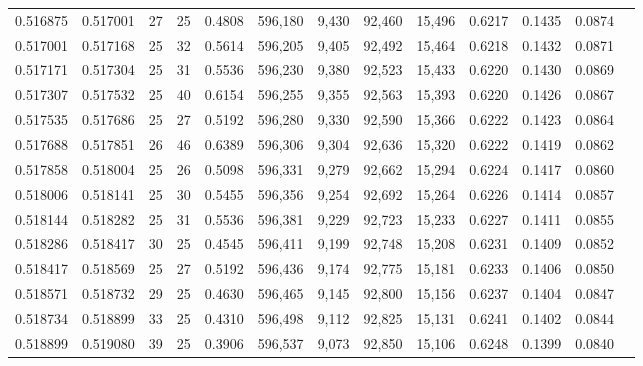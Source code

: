 \begin{tabular}{rrrrrrrrrrrrr}
0.516875 & 0.517001 &    27 &  25 &                                     0.4808 & 596,180 &   9,430 &  92,460 &  15,496 & 0.6217 & 0.1435 & 0.0874 \\
0.517001 & 0.517168 &    25 &  32 &                                     0.5614 & 596,205 &   9,405 &  92,492 &  15,464 & 0.6218 & 0.1432 & 0.0871 \\
0.517171 & 0.517304 &    25 &  31 &                                     0.5536 & 596,230 &   9,380 &  92,523 &  15,433 & 0.6220 & 0.1430 & 0.0869 \\
0.517307 & 0.517532 &    25 &  40 &                                     0.6154 & 596,255 &   9,355 &  92,563 &  15,393 & 0.6220 & 0.1426 & 0.0867 \\
0.517535 & 0.517686 &    25 &  27 &                                     0.5192 & 596,280 &   9,330 &  92,590 &  15,366 & 0.6222 & 0.1423 & 0.0864 \\
0.517688 & 0.517851 &    26 &  46 &                                     0.6389 & 596,306 &   9,304 &  92,636 &  15,320 & 0.6222 & 0.1419 & 0.0862 \\
0.517858 & 0.518004 &    25 &  26 &                                     0.5098 & 596,331 &   9,279 &  92,662 &  15,294 & 0.6224 & 0.1417 & 0.0860 \\
0.518006 & 0.518141 &    25 &  30 &                                     0.5455 & 596,356 &   9,254 &  92,692 &  15,264 & 0.6226 & 0.1414 & 0.0857 \\
0.518144 & 0.518282 &    25 &  31 &                                     0.5536 & 596,381 &   9,229 &  92,723 &  15,233 & 0.6227 & 0.1411 & 0.0855 \\
0.518286 & 0.518417 &    30 &  25 &                                     0.4545 & 596,411 &   9,199 &  92,748 &  15,208 & 0.6231 & 0.1409 & 0.0852 \\
0.518417 & 0.518569 &    25 &  27 &                                     0.5192 & 596,436 &   9,174 &  92,775 &  15,181 & 0.6233 & 0.1406 & 0.0850 \\
0.518571 & 0.518732 &    29 &  25 &                                     0.4630 & 596,465 &   9,145 &  92,800 &  15,156 & 0.6237 & 0.1404 & 0.0847 \\
0.518734 & 0.518899 &    33 &  25 &                                     0.4310 & 596,498 &   9,112 &  92,825 &  15,131 & 0.6241 & 0.1402 & 0.0844 \\
0.518899 & 0.519080 &    39 &  25 &                                     0.3906 & 596,537 &   9,073 &  92,850 &  15,106 & 0.6248 & 0.1399 & 0.0840 \\

\end{tabular}
